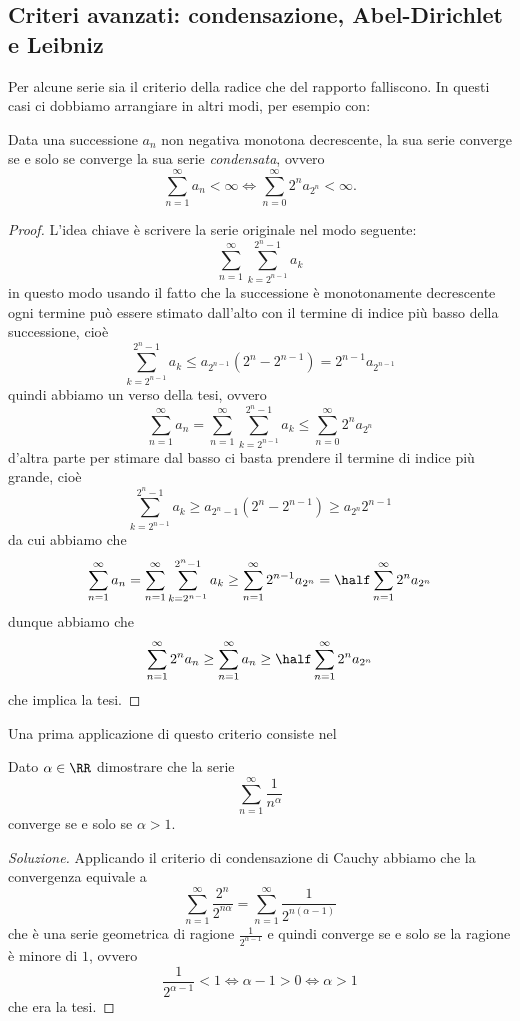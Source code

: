 \documentclass[11pt]{scrartcl}
\begin{document}
	\subsection{Criteri avanzati: condensazione, Abel-Dirichlet e Leibniz}
	Per alcune serie sia il criterio della radice che del rapporto falliscono. In questi casi ci dobbiamo arrangiare in altri modi, per esempio con:
	\begin{theorem}
		Data una successione $a_n$ non negativa monotona decrescente, la sua serie converge se e solo se converge la sua serie \textit{condensata}, ovvero
		$$\sum_{n=1}^{\infty}a_n< \infty \iff \sum_{n=0}^{\infty}2^na_{2^n}<\infty.$$
	\end{theorem}
	\begin{proof}
		L'idea chiave è scrivere la serie originale nel modo seguente:
		$$\sum_{n=1}^{\infty}\sum_{k=2^{n-1}}^{2^n-1}a_k$$
		in questo modo usando il fatto che la successione è monotonamente decrescente ogni termine può essere stimato dall'alto con il termine di indice più basso della successione, cioè
		$$\sum_{k=2^{n-1}}^{2^n-1}a_k\le a_{2^{n-1}}\left(2^n-2^{n-1}\right)=2^{n-1}a_{2^{n-1}}$$
		quindi abbiamo un verso della tesi, ovvero
		$$\sum_{n=1}^{\infty}a_n=\sum_{n=1}^{\infty}\sum_{k=2^{n-1}}^{2^n-1}a_k\le \sum_{n=0}^{\infty}2^na_{2^n}$$
		d'altra parte per stimare dal basso ci basta prendere il termine di indice più grande, cioè
		$$\sum_{k=2^{n-1}}^{2^n-1}a_k \ge a_{2^n-1}\left(2^n-2^{n-1}\right)\ge a_{2^n}2^{n-1}$$
		da cui abbiamo che 
		$$\sum_{n=1}^{\infty}a_n=\sum_{n=1}^{\infty}\sum_{k=2^{n-1}}^{2^n-1}a_k\ge \sum_{n=1}^{\infty}2^{n-1}a_{2^n}=\half \sum_{n=1}^{\infty}2^na_{2^n}$$
		dunque abbiamo che
		$$\sum_{n=1}^{\infty}2^n a_n \ge \sum_{n=1}^{\infty}a_n \ge \half\sum_{n=1}^{\infty}2^na_{2^n}$$
		che implica la tesi.
	\end{proof}
	Una prima applicazione di questo criterio consiste nel
	\begin{example}
		Dato $\alpha\in\RR$ dimostrare che la serie
		$$\sum_{n=1}^{\infty}\frac{1}{n^\alpha}$$
		converge se e solo se $\alpha>1$.
	\end{example}
	\begin{proof}[Soluzione]
		Applicando il criterio di condensazione di Cauchy abbiamo che la convergenza equivale a
		$$\sum_{n=1}^{\infty}\frac{2^n}{2^{n\alpha}}=\sum_{n=1}^\infty \frac{1}{2^{n\left(\alpha-1\right)}}$$
		che è una serie geometrica di ragione $\frac{1}{2^{\alpha-1}}$ e quindi converge se e solo se la ragione è minore di $1$, ovvero
		$$\frac{1}{2^{\alpha-1}}<1 \iff \alpha-1>0 \iff \alpha>1$$
		che era la tesi.
	\end{proof}
\end{document}
